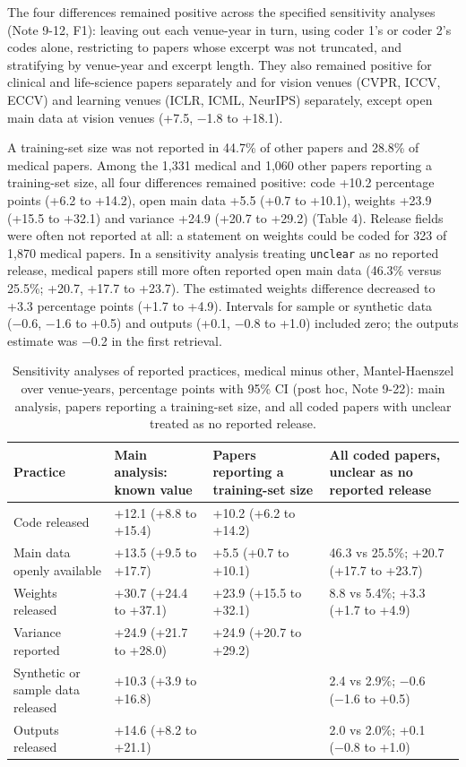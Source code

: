 \documentclass[11pt]{article}
\begin{document}
The four differences remained positive across the specified sensitivity analyses (Note 9-12, F1): leaving out each venue-year in turn, using coder 1's or coder 2's codes alone, restricting to papers whose excerpt was not truncated, and stratifying by venue-year and excerpt length. They also remained positive for clinical and life-science papers separately and for vision venues (CVPR, ICCV, ECCV) and learning venues (ICLR, ICML, NeurIPS) separately, except open main data at vision venues (+7.5, −1.8 to +18.1).

A training-set size was not reported in 44.7\% of other papers and 28.8\% of medical papers. Among the 1,331 medical and 1,060 other papers reporting a training-set size, all four differences remained positive: code +10.2 percentage points (+6.2 to +14.2), open main data +5.5 (+0.7 to +10.1), weights +23.9 (+15.5 to +32.1) and variance +24.9 (+20.7 to +29.2) (Table 4). Release fields were often not reported at all: a statement on weights could be coded for 323 of 1,870 medical papers. In a sensitivity analysis treating \texttt{unclear} as no reported release, medical papers still more often reported open main data (46.3\% versus 25.5\%; +20.7, +17.7 to +23.7). The estimated weights difference decreased to +3.3 percentage points (+1.7 to +4.9). Intervals for sample or synthetic data (−0.6, −1.6 to +0.5) and outputs (+0.1, −0.8 to +1.0) included zero; the outputs estimate was −0.2 in the first retrieval.

\begin{table}[htbp]
\centering\footnotesize
\renewcommand{\thetable}{4}
\caption{Sensitivity analyses of reported practices, medical minus other, Mantel-Haenszel over venue-years, percentage points with 95\% CI (post hoc, Note 9-22): main analysis, papers reporting a training-set size, and all coded papers with unclear treated as no reported release.}\label{tab:table4}
\begin{tabularx}{\textwidth}{XL{3.55cm}L{3.55cm}L{3.9cm}}
\toprule
\textbf{Practice} & \textbf{Main analysis: known value} & \textbf{Papers reporting a training-set size} & \textbf{All coded papers, unclear as no reported release} \\ \midrule
Code released & +12.1 (+8.8 to +15.4) & +10.2 (+6.2 to +14.2) &  \\
Main data openly available & +13.5 (+9.5 to +17.7) & +5.5 (+0.7 to +10.1) & 46.3 vs 25.5\%; +20.7 (+17.7 to +23.7) \\
Weights released & +30.7 (+24.4 to +37.1) & +23.9 (+15.5 to +32.1) & 8.8 vs 5.4\%; +3.3 (+1.7 to +4.9) \\
Variance reported & +24.9 (+21.7 to +28.0) & +24.9 (+20.7 to +29.2) &  \\
Synthetic or sample data released & +10.3 (+3.9 to +16.8) &  & 2.4 vs 2.9\%; −0.6 (−1.6 to +0.5) \\
Outputs released & +14.6 (+8.2 to +21.1) &  & 2.0 vs 2.0\%; +0.1 (−0.8 to +1.0) \\
\bottomrule
\end{tabularx}
\end{table}
\end{document}
